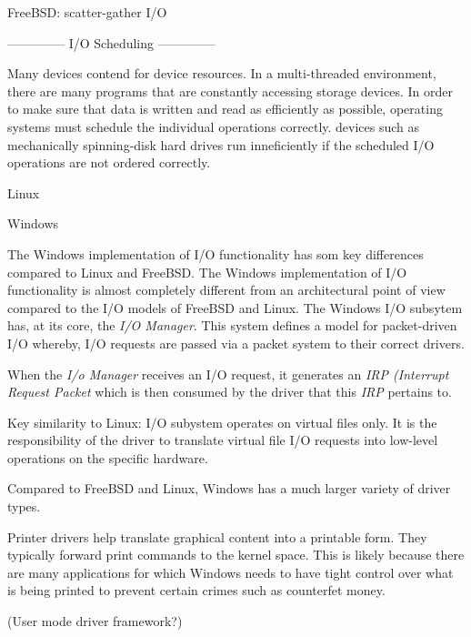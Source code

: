 FreeBSD: scatter-gather I/O 

--------------
I/O Scheduling
--------------

Many devices contend for device resources.  In a multi-threaded environment, there are many programs that are constantly accessing storage devices.  In order to make sure that data is written and read as efficiently as possible, operating systems must schedule the individual operations correctly.  devices such as mechanically spinning-disk hard drives run inneficiently if the scheduled I/O operations are not ordered correctly.

Linux


Windows

  The Windows implementation of I/O functionality has som key differences compared to Linux and FreeBSD.
  The Windows implementation of I/O functionality is almost completely different from an architectural point of view compared to the I/O models of FreeBSD and Linux. The Windows I/O subsytem has, at its core, the \textit{I/O Manager}.  This system defines a model for packet-driven I/O whereby, I/O requests are passed via a packet system to their correct drivers.
  
  When the \textit{I/o Manager} receives an I/O request, it generates an \textit{IRP (Interrupt Request Packet} which is then consumed by the driver that this \textit{IRP} pertains to.

  Key similarity to Linux: I/O subystem operates on virtual files only.  It is the responsibility of the driver to translate virtual file I/O requests into low-level operations on the specific hardware.

  Compared to FreeBSD and Linux, Windows has a much larger variety of driver types.
  
  Printer drivers  help translate graphical content into a printable form.  They typically forward print commands to the kernel space.  This is likely because there are many applications for which Windows needs to have tight control over what is being printed to prevent certain crimes such as counterfet money.

  (User mode driver framework?)

